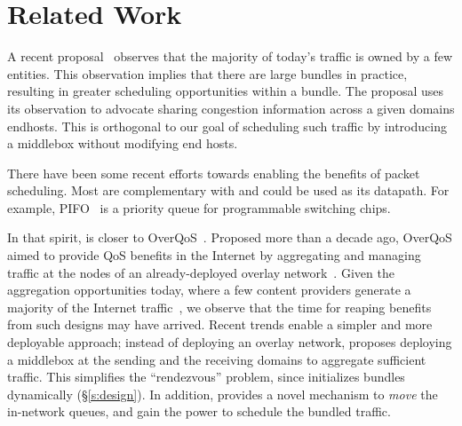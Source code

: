 \section{Related Work}
\label{s:related}


 A recent proposal~\cite{fivecomps} observes that the majority of today's traffic is owned by a few entities.
This observation implies that there are large bundles in practice, resulting in greater scheduling opportunities within a bundle. 
The proposal uses its observation to advocate sharing congestion information across a given domains endhosts. 
This is orthogonal to our goal of scheduling such traffic by introducing a middlebox without modifying end hosts.

 There have been some recent efforts towards enabling the benefits of packet scheduling. Most are complementary with \name and could be used as its datapath.
For example, PIFO~\cite{pifo} is a priority queue for programmable switching chips. 

In that spirit, \name is closer to OverQoS~\cite{overqos}. Proposed more than a decade ago, OverQoS aimed to provide QoS benefits in the Internet by aggregating and managing traffic at the nodes of an already-deployed overlay network~\cite{ron}. 
Given the aggregation opportunities today, where a few content providers generate a majority of the Internet traffic~\cite{fivecomps}, we observe that the time for reaping benefits from such designs may have arrived. 
Recent trends enable a simpler and more deployable approach; instead of deploying an overlay network, \name{} proposes deploying a middlebox at the sending and the receiving domains to aggregate sufficient traffic. 
This simplifies the ``rendezvous'' problem, since \name initializes bundles dynamically (\S\ref{s:design}).
In addition, \name provides a novel mechanism to \emph{move} the in-network queues, and gain the power to schedule the bundled traffic. 
